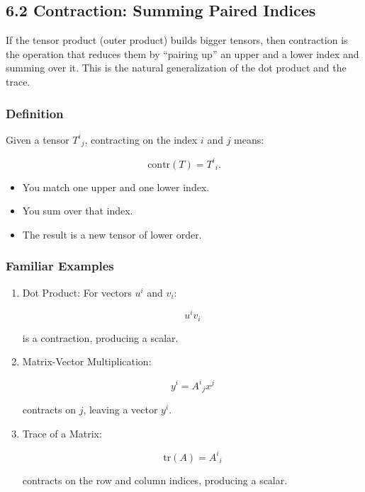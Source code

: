 \documentclass[
  letterpaper,
  DIV=11,
  numbers=noendperiod]{scrreprt}
\providecommand{\tightlist}{%
  \setlength{\itemsep}{0pt}\setlength{\parskip}{0pt}}
\begin{document}
\subsection{6.2 Contraction: Summing Paired
Indices}\label{contraction-summing-paired-indices}

If the tensor product (outer product) builds bigger tensors, then
contraction is the operation that reduces them by ``pairing up'' an
upper and a lower index and summing over it. This is the natural
generalization of the dot product and the trace.

\subsubsection{Definition}\label{definition-1}

Given a tensor \(T^{i}{}_{j}\), contracting on the index \(i\) and \(j\)
means:

\[
\mathrm{contr}(T) = T^{i}{}_{i}.
\]

\begin{itemize}
\tightlist
\item
  You match one upper and one lower index.
\item
  You sum over that index.
\item
  The result is a new tensor of lower order.
\end{itemize}

\subsubsection{Familiar Examples}\label{familiar-examples}

\begin{enumerate}
\def\labelenumi{\arabic{enumi}.}
\item
  Dot Product: For vectors \(u^i\) and \(v_i\):

  \[
  u^i v_i
  \]

  is a contraction, producing a scalar.
\item
  Matrix-Vector Multiplication:

  \[
  y^i = A^i{}_j x^j
  \]

  contracts on \(j\), leaving a vector \(y^i\).
\item
  Trace of a Matrix:

  \[
  \mathrm{tr}(A) = A^i{}_i
  \]

  contracts on the row and column indices, producing a scalar.
\end{enumerate}
\end{document}
